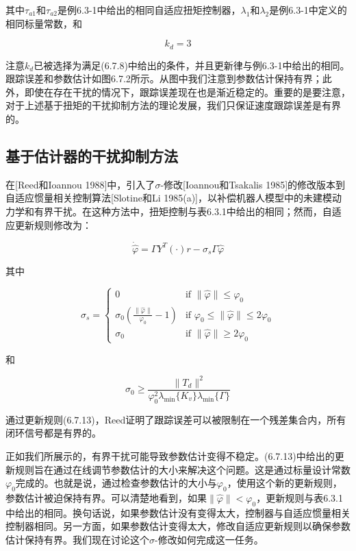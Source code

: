 \documentclass[12pt,a4paper]{ctexart}
\begin{document}
其中$\tau_{a1}$和$\tau_{a2}$是例6.3-1中给出的相同自适应扭矩控制器，$\lambda_1$和$\lambda_2$是例6.3-1中定义的相同标量常数，和

\begin{equation}
k_d = 3
\end{equation}

注意$k_d$已被选择为满足(6.7.8)中给出的条件，并且更新律与例6.3-1中给出的相同。跟踪误差和参数估计如图6.7.2所示。从图中我们注意到参数估计保持有界；此外，即使在存在干扰的情况下，跟踪误差现在也是渐近稳定的。重要的是要注意，对于上述基于扭矩的干扰抑制方法的理论发展，我们只保证速度跟踪误差是有界的。

\subsection*{基于估计器的干扰抑制方法}

在[Reed和Ioannou 1988]中，引入了$\sigma$-修改[Ioannou和Tsakalis 1985]的修改版本到自适应惯量相关控制算法[Slotine和Li 1985(a)]，以补偿机器人模型中的未建模动力学和有界干扰。在这种方法中，扭矩控制与表6.3.1中给出的相同；然而，自适应更新规则修改为：

\begin{equation}\label{eq:sigma-modification}
\dot{\hat{\varphi}} = \Gamma Y^T(\cdot)r - \sigma_s \Gamma \hat{\varphi}
\end{equation}

其中

\begin{equation}\label{eq:sigma-def}
\sigma_s = \begin{cases} 0 & \text{if } \|\hat{\varphi}\| \leq \varphi_0 \\ \sigma_0 \left(\frac{\|\hat{\varphi}\|}{\varphi_0} - 1\right) & \text{if } \varphi_0 \leq \|\hat{\varphi}\| \leq 2\varphi_0 \\ \sigma_0 & \text{if } \|\hat{\varphi}\| \geq 2\varphi_0 \end{cases}
\end{equation}

和

\begin{equation}
\sigma_0 \geq \frac{\|T_d\|^2}{\varphi_0^2 \lambda_{\min}\{K_v\} \lambda_{\min}\{\Gamma\}}
\end{equation}

通过更新规则(6.7.13)，Reed证明了跟踪误差可以被限制在一个残差集合内，所有闭环信号都是有界的。

正如我们所展示的，有界干扰可能导致参数估计变得不稳定。(6.7.13)中给出的更新规则旨在通过在线调节参数估计的大小来解决这个问题。这是通过标量设计常数$\varphi_0$完成的。也就是说，通过检查参数估计的大小与$\varphi_0$，使用这个新的更新规则，参数估计被迫保持有界。可以清楚地看到，如果$\|\hat{\varphi}\| < \varphi_0$，更新规则与表6.3.1中给出的相同。换句话说，如果参数估计没有变得太大，控制器与自适应惯量相关控制器相同。另一方面，如果参数估计变得太大，修改自适应更新规则以确保参数估计保持有界。我们现在讨论这个$\sigma$-修改如何完成这一任务。
\end{document}
